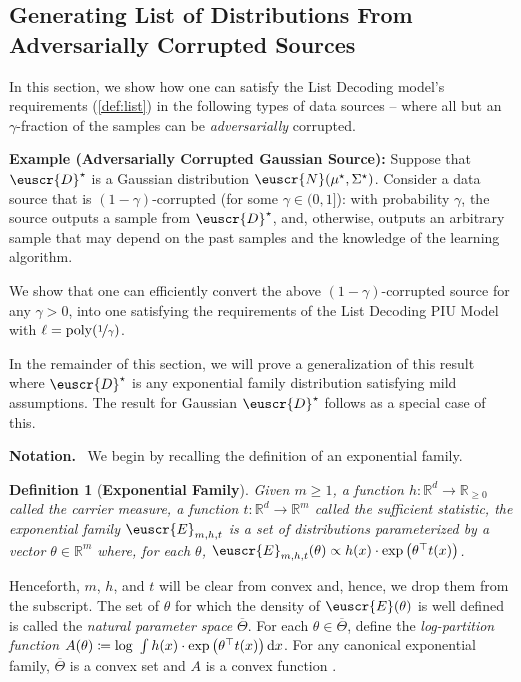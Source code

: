 \documentclass[11pt]{article}
\theoremstyle{plain}
\newtheorem{definition}{Definition}
\theoremstyle{definition}
\theoremstyle{remark}
\newcommand{\inparen}[1]{\left(#1\right)}
\newcommand{\R}{\mathbb{R}}
\newcommand{\nfrac}[2]{\nicefrac{#1}{#2}}
\newcommand{\poly}{\mathrm{poly}}
\newcommand{\customcal}[1]{\euscr{#1}}
\newcommand{\cD}{\customcal{D}}
\newcommand{\cE}{\customcal{E}}
\newcommand{\cN}{\customcal{N}}
\renewcommand{\paragraph}[1]{\medskip \noindent\textbf{#1}~}
\renewcommand{\d}{{\rm d}}
\newcommand{\cDtrue}{\cD^\star}
\newcommand{\muStar}{\mu^\star}
\newcommand{\SigmaStar}{\Sigma^\star}
\begin{document}
\subsection{Generating List of Distributions From Adversarially Corrupted Sources}\label{sec:advCorruption}
            In this section, we show how one can satisfy the List Decoding model's requirements (\cref{def:list}) in the following types of data sources -- where all but an $\gamma$-fraction of the samples can be \textit{adversarially} corrupted.

            \begin{mdframed}
                \textbf{Example (Adversarially Corrupted Gaussian Source):}\quad
                Suppose that $\cDtrue$ is a Gaussian distribution $\cN(\muStar,\SigmaStar)$.
                Consider a data source that is $(1-\gamma)$-corrupted (for some $\gamma\in (0,1]$):
                    with probability $\gamma$, the source outputs a sample from $\cDtrue$, and, otherwise, outputs an arbitrary sample that may depend on the past samples and the knowledge of the learning algorithm.
            \end{mdframed}
            We show that one can efficiently convert the above $(1-\gamma)$-corrupted source for any $\gamma>0$, into one satisfying the requirements of the List Decoding PIU Model with $\ell= \poly(\nfrac{1}{\gamma})$.

            In the remainder of this section, we will prove a generalization of this result where $\cDtrue$ is any exponential family distribution satisfying mild assumptions.
            The result for Gaussian $\cDtrue$ follows as a special case of this.
            
            

            \paragraph{Notation.}
            We begin by recalling the definition of an exponential family. %
            \begin{definition}[\textbf{Exponential Family}]
                Given $m\geq 1$, a function $h\colon \R^d\to \R_{\geq 0}$ called the \emph{carrier measure}, a function $t\colon \R^d\to \R^m$ called the \emph{sufficient statistic}, the exponential family $\cE_{m,h,t}$ is a set of distributions parameterized by a vector $\theta\in \R^m$ where, for each $\theta$, $\cE_{m,h,t}(\theta)\propto h(x) \cdot \exp\inparen{\theta^\top t(x)}$.
            \end{definition}
            Henceforth, $m$, $h$, and $t$ will be clear from convex and, hence, we drop them from the subscript. %
            The set of $\theta$ for which the density of $\cE(\theta)$ is well defined is called the \textit{natural parameter space} $\overline{\Theta}$.
            For each $\theta\in \overline{\Theta}$, define the \textit{log-partition function} $A(\theta)\coloneqq \log~{\int h(x) \cdot \exp\inparen{\theta^\top t(x)}\d x}$.
            For any canonical exponential family, $\overline{\Theta}$ is a convex set and $A$ is a convex function \cite{dasgupta2008asymptotic}.
\end{document}
